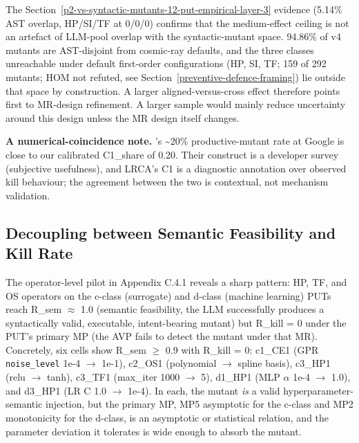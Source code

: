 \documentclass[12pt]{article}
\begin{document}
The Section~\ref{p2-vs-syntactic-mutants-12-put-empirical-layer-3} evidence (5.14\% AST overlap, HP/SI/TF at 0/0/0) confirms that
the medium-effect ceiling is not an artefact of LLM-pool overlap with
the syntactic-mutant space. 94.86\% of v4 mutants are AST-disjoint from
cosmic-ray defaults, and the three classes unreachable under default
first-order configurations (HP, SI, TF; 159 of 292 mutants; HOM not
refuted, see Section~\ref{preventive-defence-framing}) lie outside that space by construction. A
larger aligned-versus-cross effect therefore points first to MR-design
refinement. A larger sample would mainly reduce uncertainty around this
design unless the MR design itself changes.

\textbf{A numerical-coincidence note.} \citeauthor{1929c365d171c78c9c24b242b5b57e2832bc907b}'s \citeyearpar{1929c365d171c78c9c24b242b5b57e2832bc907b}
\textasciitilde20\% productive-mutant rate at Google is close to our
calibrated C1\_share of 0.20. Their construct is a developer survey
(subjective usefulness), and LRCA's C1 is a diagnostic annotation over
observed kill behaviour; the agreement between the two is contextual,
not mechanism validation.

\subsection{Decoupling between Semantic Feasibility and Kill Rate}\label{decoupling-between-r_sem-and-r_kill}

The operator-level pilot in Appendix C.4.1 reveals a sharp pattern: HP,
TF, and OS operators on the c-class (surrogate) and d-class (machine
learning) PUTs reach R\_sem $\approx$ 1.0 (semantic feasibility, the LLM
successfully produces a syntactically valid, executable, intent-bearing
mutant) but R\_kill = 0 under the PUT's primary MP (the AVP fails to
detect the mutant under that MR). Concretely, six cells show R\_sem $\geq$
0.9 with R\_kill = 0: c1\_CE1 (GPR \texttt{noise\_level} 1e-4 $\to$ 1e-1),
c2\_OS1 (polynomial $\to$ spline basis), c3\_HP1 (relu $\to$ tanh), c3\_TF1
(max\_iter 1000 $\to$ 5), d1\_HP1 (MLP $\alpha$ 1e-4 $\to$ 1.0), and d3\_HP1 (LR C 1.0
$\to$ 1e-4). In each, the mutant \emph{is} a valid hyperparameter-semantic
injection, but the primary MP, MP5 asymptotic for the c-class and MP2
monotonicity for the d-class, is an asymptotic or statistical relation,
and the parameter deviation it tolerates is wide enough to absorb the
mutant.
\end{document}
